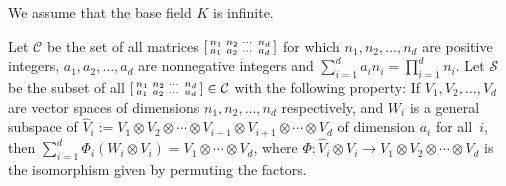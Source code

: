 \documentclass[11pt]{article}
\theoremstyle{definition}
\theoremstyle{remark}
\begin{document}
\newcommand{\B}{{\mathcal B}}
\newcommand{\C}{{\mathbb C}}
\newcommand{\N}{{\mathbb N}}
\newcommand{\F}{{\mathbb F}}
\newcommand{\Q}{{\mathbb Q}}
\newcommand{\Z}{{\mathbb Z}}
\newcommand{\tnr}{\operatorname{Tr}}
\newcommand{\tnrace}{\operatorname{Tr}}
%
%
\newcommand{\SL}{\operatorname{SL}}
\newcommand{\Mod}{\operatorname{mod}}

\newcommand{\VV}{{\mathbb V}}

\newcommand{\nullcone}{\mathcal{N}}
%
%
\newcommand{\Sym}{S}

\newcommand{\rk} {\operatorname{rk}}
\newcommand{\g} {\mathfrak{g}}
\newcommand{\n} {\mathfrak{n}}
\newcommand{\h} {\mathfrak{h}}
\newcommand{\tn}{\mathfrak{t}}
\newcommand{\sln}{\mathfrak{sl}_n}
\newcommand{\adaptable} {adaptable}
\newcommand{\End}{{\rm End}}
\newcommand{\U}{\operatorname{U}}
\newcommand{\SU}{\operatorname{SU}}
\newcommand{\ad}{\rm ad}
\newcommand{\uncramped} {uncramped}
\newcommand{\Supp} {{\rm Supp}}
\newcommand{\wt}{\widetilde}
\newcommand{\isom} {\stackrel{\sim}{\longrightarrow}}
 \newcommand{\sslash}{\mathbin{\mkern-4mu/\mkern-6mu/\mkern-4mu}}
 \newcommand{\CC}{{\mathcal C}}
\newcommand{\SSS}{{\mathcal S}}


%
%
%




\newcommand{\comm}[1]{\textcolor{red}{$\clubsuit${\it #1}$\clubsuit$}}


%
%
%
%
%


%

We assume that the base field $K$ is infinite. 

Let $\CC$ be the set of all matrices $\begin{bsmallmatrix} n_1 & n_2 & \cdots & n_d\\a_1 & a_2  & \cdots & a_d\end{bsmallmatrix}$  for which  $n_1,n_2,\dots,n_d$ are positive integers, $a_1,a_2,\dots,a_d$ are nonnegative integers
and $\sum_{i=1}^d a_i n_i=\prod_{i=1}^d n_i$. Let $\SSS$ be the subset of all  $\begin{bsmallmatrix} n_1 & n_2 & \cdots & n_d\\a_1 & a_2  & \cdots & a_d\end{bsmallmatrix}\in {\CC}$ with the following property:
If $V_1,V_2,\dots,V_d$ are vector spaces of dimensions $n_1,n_2,\dots,n_d$ respectively, and $W_i$ is a general subspace
of $\widehat{V}_i:=V_1\otimes V_2\otimes \cdots \otimes V_{i-1}\otimes V_{i+1}\otimes \cdots\otimes V_d$ of dimension $a_i$ for all~$i$,
then $\sum_{i=1}^d \Phi_i( W_i\otimes V_i) = V_1 \otimes \cdots \otimes V_d$, where $\Phi:\widehat{V}_i\otimes V_i\to V_1\otimes V_2\otimes \cdots \otimes  V_d$ is
the isomorphism given by permuting the factors.
\end{document}

